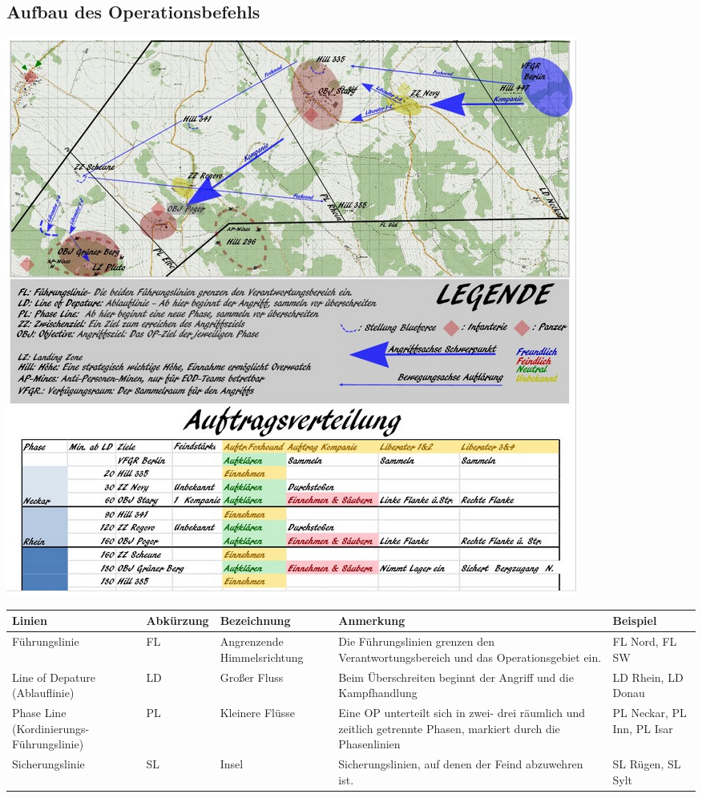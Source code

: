 \newpage

\subsection{Aufbau des Operationsbefehls}

\begin{minipage}[t]{1\textwidth}
	\includegraphics[width=\textwidth]{./Grafiken/KarteUndMarkierungen/OP-Befehl.png}
\end{minipage}

\begin{longtable}{|p{3cm}|p{}|p{}|p{4cm}|p{}|} 																											\hline
	Linien				&		Abkürzung			&		Bezeichnung				&			Anmerkung 									&		Beispiel 			\\ \hline
	Führungslinie			&		FL				&		Angrenzende Himmelsrichtung	&			Die Führungslinien grenzen \newline den Verantwortungsbereich und \newline das Operationsgebiet ein. & FL Nord, FL SW \\ \hline
	Line of Depature (Ablauflinie)&		LD				&		Großer Fluss				&			Beim Überschreiten beginnt der Angriff und die Kampfhandlung 	&	LD Rhein, LD Donau			\\ \hline
	Phase Line (Kordinierungs-Führungslinie) & PL				&		Kleinere Flüsse			&			Eine OP unterteilt sich in zwei- drei räumlich und zeitlich getrennte Phasen, markiert durch die Phasenlinien	& PL Neckar, PL Inn, PL Isar	\\ \hline
	Sicherungslinie 		&		SL 				&		Insel					&			Sicherungslinien, auf denen der Feind abzuwehren ist.		&	SL Rügen, SL Sylt			\\ \hline
\end{longtable}

